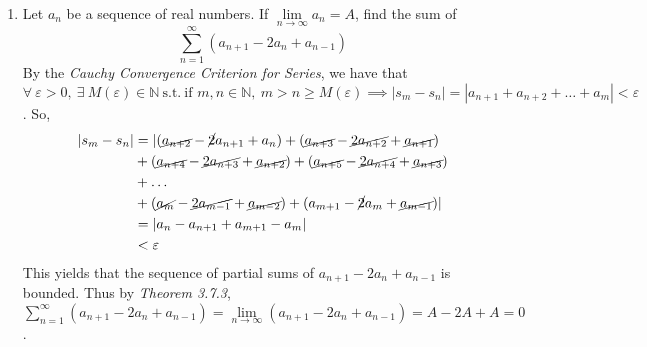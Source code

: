 \documentclass[12pt,letterpaper]{article}
\newcommand{\limx}[2]{\displaystyle\lim\limits_{#1 \to #2}}
\newcommand{\st}{\ \text{s.t.}\ }
\newcommand{\N}{\mathbb{N}}
\theoremstyle{case}
\theoremstyle{definition}
\begin{document}
\begin{enumerate}
\begin{enumerate}
\begin{proof}
\begin{itemize}
					\item[$(<=)$] Similarly, suppose $a_n$ is a convergent sequence. Then by the \textit{Cauchy Convergence Criterion}, $a_n$ is a Cauchy sequence. So $\forall\ \varepsilon>0,\ \exists\ H(\varepsilon) \in \N \st \forall\ m>n\geq H(\varepsilon),\ n,m \in \N,\ |a_m-a_n|<\varepsilon$. So,
					\begin{align*}
						|a_m-a_n| &= |(a_{n+1}-a_n)+(a_{n+2}-a_{n+1})+\dots+(a_{m-1}-a_{m-2})+(a_m-a_{m-1})| \\
						&= |(s_{m-1}+a_m)-(s_{n-1}+a_n)|, \\
						&\text{by the definition of the infinite series generated by $(a_n)$}\\
						&=|s_{m-1}+a_m-s_{n-1}-a_n|\\
						&= |s_m-s_n| \\
						&<\varepsilon
					\end{align*}
					Thus by the \textit{Cauchy Criterion for Series}, since $|s_m-s_n|<\varepsilon$ for all $m>n\geq H(\varepsilon), H(\varepsilon),m,n\in \N$, the series $\sum a_n-a_{n-1}$ converges, which implies that the series $\sum b_n$ converges.
				\end{itemize}
			\end{proof}
			Thus, we have that $\sum b_n=\limx{n}{\infty} (b_n)=\limx{n}{\infty} (a_n-a_{n-1})$, by \textit{Theorem 3.7.3}, and thus by the \textit{$n$th Term Test}, since $\sum b_n$ converges, we have that $\limx{n}{\infty} (a_n-a_{n-1})=0$. Thus $\sum b_n=0$.\\
			
			\item Let $a_n$ be a sequence of real numbers. If $\limx{n}{\infty} a_n=A$, find the sum of \[\displaystyle\sum_{n=1}^{\infty} (a_{n+1}-2a_n+a_{n-1})\]
			By the \textit{Cauchy Convergence Criterion for Series}, we have that $\forall\ \varepsilon>0,\ \exists\ M(\varepsilon) \in \N \st \text{if } m,n \in \N,\ m>n\geq M(\varepsilon) \implies |s_m-s_n|=|a_{n+1}+a_{n+2}+\dots + a_m|<\varepsilon$. So,
			\begin{align*}
				|s_m-s_n|&=|(\cancel{a_{n+2}}-\cancel{2}a_{n+1}+a_n)+(\cancel{a_{n+3}}-\cancel{2a_{n+2}}+\cancel{a_{n+1}}) \\
				&+(\cancel{a_{n+4}}-\cancel{2a_{n+3}}+\cancel{a_{n+2}})+(\cancel{a_{n+5}}-\cancel{2a_{n+4}}+\cancel{a_{n+3}})\\
				&+\dots\\
				&+(\cancel{a_m}-\cancel{2a_{m-1}}+\cancel{a_{m-2}})+(a_{m+1}-\cancel{2}a_m+\cancel{a_{m-1}})| \\
				&= |a_n-a_{n+1}+a_{m+1}-a_m| \\
				&<\varepsilon
			\end{align*}
			This yields that the sequence of partial sums of $a_{n+1}-2a_n+a_{n-1}$ is bounded. Thus by \textit{Theorem 3.7.3}, $\displaystyle\sum_{n=1}^{\infty}(a_{n+1}-2a_n+a_{n-1})=\limx{n}{\infty} (a_{n+1}-2a_n+a_{n-1}) = A-2A+A = 0$. \\
			

\end{enumerate}
\end{enumerate}
\end{document}
